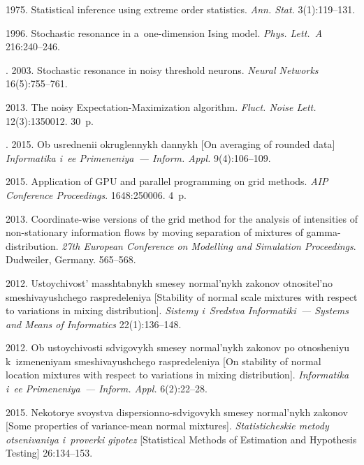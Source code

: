 \begin{multicols}{2}
{{\begin{thebibliography}{99}
 1975. Statistical inference using extreme order statistics. 
\textit{Ann. Stat.} 3(1):119--131.

 1996. Stochastic resonance in 
a~one-dimension Ising model. \textit{Phys. Lett.~A} 216:240--246.

. 2003. Stochastic resonance in noisy threshold neurons. 
\textit{Neural Networks} 16(5):755--761.

 2013. The noisy Expectation-Maximization 
algorithm. \textit{Fluct. Noise Lett.} 12(3):1350012. 30~p.

. 2015. Ob usrednenii okruglennykh dannykh 
[On averaging of rounded data]
\textit{Informatika i~ee Primeneniya~---  Inform. Appl.} 9(4):106--109.

 2015. 
Application of GPU and parallel programming on grid methods.  
\textit{AIP Conference Proceedings}. 1648:250006. 4~p.

 2013. Coordinate-wise versions of the grid method for the analysis of intensities 
 of non-stationary information flows by moving separation of mixtures of 
 gamma-distribution. \textit{27th European Conference on Modelling and Simulation
 Proceedings}. Dudweiler, Germany. 565--568.


 2012. Ustoychivost' masshtabnykh smesey normal'nykh zakonov 
otnositel'no sme\-shi\-va\-yushche\-go raspredeleniya [Stability of normal scale mixtures 
with respect to variations in mixing distribution]. 
\textit{Sistemy i~Sredstva Informatiki~--- Systems and Means of Informatics} 
22(1):136--148.

 2012. Ob ustoychivosti sdvigovykh smesey normal'nykh zakonov 
po otnosheniyu k~izmeneniyam smeshivayushchego raspredeleniya [On stability of 
normal location mixtures with respect to variations in mixing distribution]. 
\textit{Informatika i~ee Primeneniya~--- Inform. Appl.} 6(2):22--28.

 2015. 
Nekotorye svoystva dispersionno-sdvigovykh smesey normal'nykh zakonov 
[Some properties of variance-mean normal mixtures]. 
\textit{Statisticheskie metody otsenivaniya i~proverki gipotez} 
[Statistical Methods of Estimation and Hypothesis Testing] 26:134--153.


\end{thebibliography}}}
\end{multicols}
